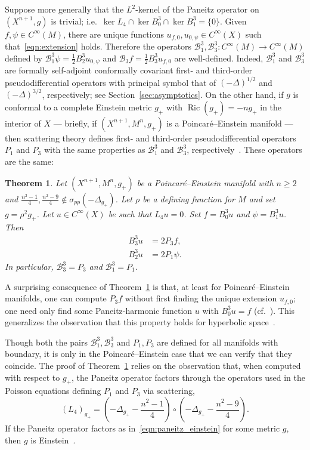 \documentclass{amsart}
\newtheorem{thm}{Theorem}[section]
\theoremstyle{definition}
\theoremstyle{remark}
\numberwithin{equation}{section}
\begin{document}
Suppose more generally that the $L^2$-kernel of the Paneitz operator on $(X^{n+1},g)$ is trivial; i.e.\ $\ker L_4\cap\ker B_0^3\cap\ker B_1^3=\{0\}$.  Given $f,\psi\in C^\infty(M)$, there are unique functions $u_{f,0},u_{0,\psi}\in C^\infty(X)$ such that~\eqref{eqn:extension} holds.  Therefore the operators ${\mathcal{B}}_1^3,{\mathcal{B}}_3^3\colon C^\infty(M)\to C^\infty(M)$ defined by ${\mathcal{B}}_1^3\psi=\frac{1}{2}B_2^3u_{0,\psi}$ and ${\mathcal{B}}_3f=\frac{1}{2}B_3^3u_{f,0}$ are well-defined.  Indeed, ${\mathcal{B}}_1^3$ and ${\mathcal{B}}_3^3$ are formally self-adjoint conformally covariant first- and third-order pseudodifferential operators with principal symbol that of $(-\Delta)^{1/2}$ and $(-\Delta)^{3/2}$, respectively; see Section~\ref{sec:asymptotics}.  On the other hand, if $g$ is conformal to a complete Einstein metric $g_+$ with $\operatorname{Ric}(g_+)=-ng_+$ in the interior of $X$ --- briefly, if $(X^{n+1},M^n,g_+)$ is a Poincar\'e--Einstein manifold --- then scattering theory defines first- and third-order pseudodifferential operators $P_1$ and $P_3$ with the same properties as ${\mathcal{B}}_1^3$ and ${\mathcal{B}}_3^3$, respectively~\cite{GrahamZworski2003}.  These operators are the same:

\begin{thm}
 \label{thm:asymptotics}
 Let $(X^{n+1},M^n,g_+)$ be a Poincar\'e--Einstein manifold with $n\geq2$ and $\frac{n^2-1}{4},\frac{n^2-9}{4}\not\in\sigma_{pp}(-\Delta_{g_+})$.  Let $\rho$ be a defining function for $M$ and set $g=\rho^2g_+$.  Let $u\in C^\infty(X)$ be such that $L_4u=0$.  Set $f=B_0^3u$ and $\psi=B_1^3u$.  Then
 \begin{align*}
  B_3^3u & = 2P_3f, \\
  B_2^3u & = 2P_1\psi .
 \end{align*}
 In particular, ${\mathcal{B}}_3^3=P_3$ and ${\mathcal{B}}_1^3=P_1$.
\end{thm}

A surprising consequence of Theorem~\ref{thm:asymptotics} is that, at least for Poincar\'e--Einstein manifolds, one can compute $P_3f$ without first finding the unique extension $u_{f,0}$; one need only find some Paneitz-harmonic function $u$ with $B_0^3u=f$ (cf.\ \cite{CaseChang2013,ChangGonzalez2011}).  This generalizes the observation that this property holds for hyperbolic space~\cite{AcheChang2015,BransonGover2001}.

Though both the pairs ${\mathcal{B}}_1^3,{\mathcal{B}}_3^3$ and $P_1,P_3$ are defined for all manifolds with boundary, it is only in the Poincar\'e--Einstein case that we can verify that they coincide.  The proof of Theorem~\ref{thm:asymptotics} relies on the observation that, when computed with respect to $g_+$, the Paneitz operator factors through the operators used in the Poisson equations defining $P_1$ and $P_3$ via scattering,
\begin{equation}
 \label{eqn:paneitz_einstein}
 \left(L_4\right)_{g_+} = \left(-\Delta_{g_+} - \frac{n^2-1}{4}\right)\circ\left(-\Delta_{g_+} - \frac{n^2-9}{4}\right) .
\end{equation}
If the Paneitz operator factors as in~\eqref{eqn:paneitz_einstein} for some metric $g$, then $g$ is Einstein~\cite{Robert2009}.
\end{document}
